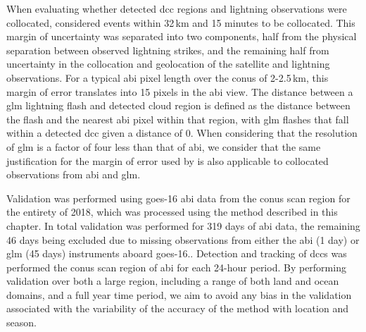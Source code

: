 When evaluating whether detected \acrshort{dcc} regions and lightning observations were collocated, \citet{muller_novel_2019} considered events within 32\,\unit{km} and 15 minutes to be collocated.
This margin of uncertainty was separated into two components, half from the physical separation between observed lightning strikes, and the remaining half from uncertainty in the collocation and geolocation of the satellite and lightning observations.
For a typical \acrshort{abi} pixel length over the \acrshort{conus} of 2-2.5\,\unit{km}, this margin of error translates into 15 pixels in the \acrshort{abi} view.
The distance between a \acrshort{glm} lightning flash and detected cloud region is defined as the distance between the flash and the nearest \acrshort{abi} pixel within that region, with \acrshort{glm} flashes that fall within a detected \acrshort{dcc} given a distance of 0.
When considering that the resolution of \acrshort{glm} is a factor of four less than that of \acrshort{abi}, we consider that the same justification for the margin of error used by \citet{muller_novel_2019} is also applicable to collocated observations from \acrshort{abi} and \acrshort{glm}.

Validation was performed using \acrshort{goes}-16 \acrshort{abi} data from the \acrshort{conus} scan region for the entirety of 2018, which was processed using the method described in this chapter.
In total validation was performed for 319 days of \acrshort{abi} data, the remaining 46 days being excluded due to missing observations from either the \acrshort{abi} (1 day) or \acrshort{glm} (45 days) instruments aboard \acrshort{goes}-16..
Detection and tracking of \acrshort{dcc}s was performed the \acrshort{conus} scan region of \acrshort{abi} for each 24-hour period. 
By performing validation over both a large region, including a range of both land and ocean domains, and a full year time period, we aim to avoid any bias in the validation associated with the variability of the accuracy of the method with location and season.

